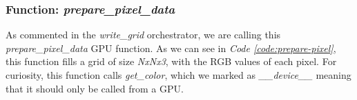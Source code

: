 \documentclass[../main.tex]{subfiles}
\begin{document}
\subsubsection{Function: \textit{prepare\_pixel\_data}}

As commented in the \textit{write\_grid} orchestrator, we are calling this \textit{prepare\_pixel\_data} GPU function. As we can see in \textit{Code \ref{code:prepare-pixel}}, this function fills a grid of size \textit{NxNx3}, with the RGB values of each pixel. For curiosity, this function calls \textit{get\_color}, which we marked as \textit{\_\_device\_\_} meaning that it should only be called from a GPU.
\end{document}
